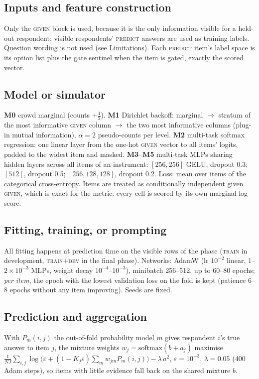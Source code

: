 \documentclass{article}
\begin{document}
\subsection{Inputs and feature construction}
Only the \textsc{given} block is used, because it is the only information visible for a held-out respondent; visible respondents' \textsc{predict} answers are used as training labels. Question wording is not used (see Limitations). Each \textsc{predict} item's label space is its option list plus the gate sentinel when the item is gated, exactly the scored vector.

\subsection{Model or simulator}
\textbf{M0} crowd marginal (counts $+\tfrac12$). \textbf{M1} Dirichlet backoff: marginal $\to$ stratum of the most informative \textsc{given} column $\to$ the two most informative columns (plug-in mutual information), $\alpha{=}2$ pseudo-counts per level. \textbf{M2} multi-task softmax regression: one linear layer from the one-hot \textsc{given} vector to all items' logits, padded to the widest item and masked. \textbf{M3--M5} multi-task MLPs sharing hidden layers across all items of an instrument: $[256,256]$ GELU, dropout 0.3; $[512]$, dropout 0.5; $[256,128,128]$, dropout 0.2. Loss: mean over items of the categorical cross-entropy. Items are treated as conditionally independent given \textsc{given}, which is exact for the metric: every cell is scored by its own marginal log score.

\subsection{Fitting, training, or prompting}
All fitting happens at prediction time on the visible rows of the phase (\textsc{train} in development, \textsc{train}+\textsc{dev} in the final phase). Networks: AdamW (lr $10^{-2}$ linear, $1$--$2\times10^{-3}$ MLPs, weight decay $10^{-4}$--$10^{-3}$), minibatch 256--512, up to 60--80 epochs; \emph{per item}, the epoch with the lowest validation loss on the fold is kept (patience 6--8 epochs without any item improving). Seeds are fixed.

\subsection{Prediction and aggregation}
With $P_m(i,j)$ the out-of-fold probability model $m$ gives respondent $i$'s true answer to item $j$, the mixture weights $w_j=\mathrm{softmax}(b+a_j)$ maximise
$\frac1{NJ}\sum_{i,j}\log\big(\varepsilon+(1-K_j\varepsilon)\sum_m w_{jm}P_m(i,j)\big)-\lambda\,\overline{a^2}$, $\varepsilon{=}10^{-3}$, $\lambda{=}0.05$ (400 Adam steps), so items with little evidence fall back on the shared mixture $b$.
\end{document}
